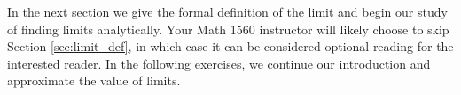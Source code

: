 In the next section we give the formal definition of the limit and begin our study of finding limits analytically. Your Math 1560 instructor will likely choose to skip Section \ref{sec:limit_def}, in which case it can be considered optional reading for the interested reader.  In the following exercises, we continue our introduction and approximate the value of limits.\\


